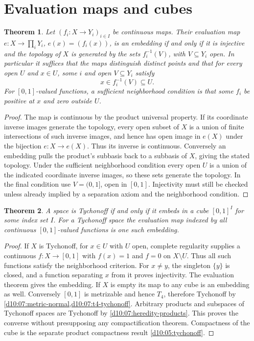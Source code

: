 \documentclass[11pt,oneside,openany]{book}
\newtheorem{theorem}{Theorem}[chapter]
\theoremstyle{definition}
\theoremstyle{remark}
\begin{document}
\section{Evaluation maps and cubes}
\begin{theorem}\label{d10:10:evaluation-embedding}
Let $(f_i:X\to Y_i)_{i\in I}$ be continuous maps. Their evaluation map $e:X\to\prod_iY_i$, $e(x)=(f_i(x))$, is an embedding if and only if it is injective and the topology of $X$ is generated by the sets $f_i^{-1}(V)$, with $V\subseteq Y_i$ open. In particular it suffices that the maps distinguish distinct points and that for every open $U$ and $x\in U$, some $i$ and open $V\subseteq Y_i$ satisfy
\[
 x\in f_i^{-1}(V)\subseteq U.
\]
For $[0,1]$-valued functions, a sufficient neighborhood condition is that some $f_i$ be positive at $x$ and zero outside $U$.
\end{theorem}
\begin{proof}
The map is continuous by the product universal property. If its coordinate inverse images generate the topology, every open subset of $X$ is a union of finite intersections of such inverse images, and hence has open image in $e(X)$ under the bijection $e:X\to e(X)$. Thus its inverse is continuous. Conversely an embedding pulls the product's subbasis back to a subbasis of $X$, giving the stated topology. Under the sufficient neighborhood condition every open $U$ is a union of the indicated coordinate inverse images, so these sets generate the topology. In the final condition use $V=(0,1]$, open in $[0,1]$. Injectivity must still be checked unless already implied by a separation axiom and the neighborhood condition.
\end{proof}

\begin{theorem}\label{d10:10:tychonoff-cube}
A space is Tychonoff if and only if it embeds in a cube $[0,1]^I$ for some index set $I$. For a Tychonoff space the evaluation map indexed by all continuous $[0,1]$-valued functions is one such embedding.
\end{theorem}
\begin{proof}
If $X$ is Tychonoff, for $x\in U$ with $U$ open, complete regularity supplies a continuous $f:X\to[0,1]$ with $f(x)=1$ and $f=0$ on $X\setminus U$. Thus all such functions satisfy the neighborhood criterion. For $x\ne y$, the singleton $\{y\}$ is closed, and a function separating $x$ from it proves injectivity. The evaluation theorem gives the embedding. If $X$ is empty its map to any cube is an embedding as well. Conversely $[0,1]$ is metrizable and hence $T_4$, therefore Tychonoff by \cref{d10:07:metric-normal,d10:07:t4-tychonoff}. Arbitrary products and subspaces of Tychonoff spaces are Tychonoff by \cref{d10:07:heredity-products}. This proves the converse without presupposing any compactification theorem. Compactness of the cube is the separate product compactness result \cref{d10:05:tychonoff}.
\end{proof}
\end{document}
